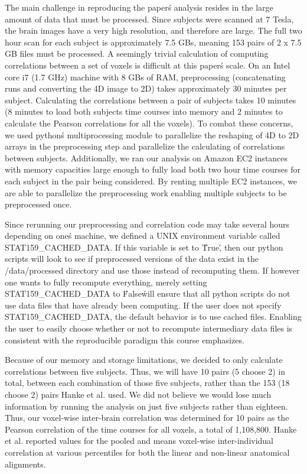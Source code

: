 \documentclass[11pt]{article}
\begin{document}
The main challenge in reproducing the paper\'s analysis resides in the large
amount of data that must be processed. Since subjects were scanned at 7 Tesla,
the brain images have a very high resolution, and therefore are large. The
full two hour scan for each subject is approximately 7.5 GBs, meaning 153
pairs of 2 x 7.5 GB files must be processed. A seemingly trivial calculation
of computing correlations between a set of voxels is difficult at this paper\'s
scale. On an Intel core i7 (1.7 GHz) machine with 8 GBs of RAM, preprocessing
(concatenating runs and converting the 4D image to 2D) takes approximately 30
minutes per subject. Calculating the correlations between a pair of subjects
takes 10 minutes (8 minutes to load both subjects time courses into memory and
2 minutes to calculate the Pearson correlations for all the voxels).  To
combat these concerns, we used python\'s multiprocessing module to parallelize
the reshaping of 4D to 2D arrays in the preprocessing step and parallelize the
calculating of correlations between subjects. Additionally, we ran our
analysis on Amazon EC2 instances with memory capacities large enough to fully
load both two hour time courses for each subject in the pair being considered.
By renting multiple EC2 instances, we are able to parallelize the
preprocessing work enabling multiple subjects to be preprocessed once.

Since rerunning our preprocessing and correlation code may take several hours
depending on one\'s machine, we defined a UNIX environment variable called
STAT159\_CACHED\_DATA. If this variable is set to \'True\', then our python
scripts will look to see if preprocessed versions of the data exist in the
/data/processed directory and use those instead of recomputing them. If
however one wants to fully recompute everything, merely setting
STAT159\_CACHED\_DATA to \'False\' will ensure that all python scripts do not
use data files that have already been computing. If the user does not specify
STAT159\_CACHED\_DATA, the default behavior is to use cached files. Enabling
the user to easily choose whether or not to recompute intermediary data files
is consistent with the reproducible paradigm this course emphasizes.

Because of our memory and storage limitations, we decided to only calculate 
correlations between five subjects.  Thus, we will have 10 pairs (5 choose 2) 
in total, between each combination of those five subjects, rather than the 153
(18 choose 2) pairs Hanke et al. used.  We did not believe we would lose much
information by running the analysis on just five subjects rather than eighteen.
Thus, our voxel-wise inter-brain correlation was determined for 10 pairs as the 
Pearson correlation of the time courses for all voxels, a total of 1,108,800.
Hanke et al. reported values for the pooled and means voxel-wise inter-individual 
correlation at various percentiles for both the linear and non-linear 
anatomical alignments.  
\end{document}
